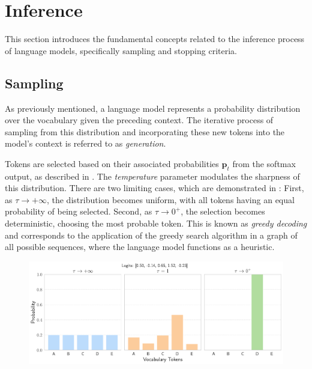 \section{Inference}\label{sec:inference}

This section introduces the fundamental concepts related to the inference process of language models, specifically sampling and stopping criteria.

\subsection{Sampling}\label{sec:sampling}

As previously mentioned, a language model represents a probability distribution over the vocabulary given the preceding context. The iterative process of sampling from this distribution and incorporating these new tokens into the model's context is referred to as \textit{generation}.

Tokens are selected based on their associated probabilities \(\mathbf{p}_t\) from the softmax output, as described in . The \textit{temperature} parameter modulates the sharpness of this distribution. There are two limiting cases, which are demonstrated in : First, as \(\tau \to +\infty\), the distribution becomes uniform, with all tokens having an equal probability of being selected. Second, as \(\tau \to 0^+\), the selection becomes deterministic, choosing the most probable token. This is known as \textit{greedy decoding} and corresponds to the application of the greedy search algorithm in a graph of all possible sequences, where the language model functions as a heuristic.

\begin{figure}[ht]
    \centering
    \includegraphics[width=\textwidth]{figures/softmax-temperature.pdf}
    \label{fig:softmax-temperature}
\end{figure}

